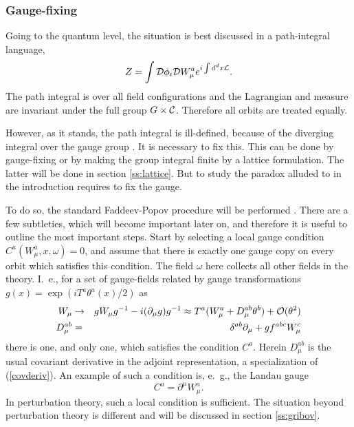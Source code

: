 \documentclass[final,twoside,12pt]{article}
\newcommand*{\La}{{\cal{L}}}
\newcommand*{\no}{\noindent}
\newcommand*{\bea}{\begin{eqnarray}}
\newcommand*{\eea}{\end{eqnarray}}
\newcommand*{\be}{\begin{equation}}
\newcommand*{\ee}{\end{equation}}
\newcommand*{\pd}{\partial}
\newcommand*{\pdm}{\pd_{\mu}}
\newcommand*{\pref}[1]{(\ref{#1})}
\newcommand*{\nn}{\nonumber}
\newcommand*{\1}{1\!\!\!\bot}
\newcommand*{\cd}{{\cal D}}
\newcommand*{\pint}{\int\cd}
\begin{document}
\subsubsection{Gauge-fixing}\label{sss:gf}

Going to the quantum level, the situation is best discussed in a path-integral language,
\be
Z=\pint\phi_i\cd W_\mu^a e^{i\int d^d x\La}\nn.
\ee
\no The path integral is over all field configurations and the Lagrangian and measure are invariant under the full group $G\times{\cal C}$. Therefore all orbits are treated equally.

However, as it stands, the path integral is ill-defined, because of the diverging integral over the gauge group \cite{Bohm:2001yx}. It is necessary to fix this. This can be done by gauge-fixing or by making the group integral finite by a lattice formulation. The latter will be done in section \ref{ss:lattice}. But to study the paradox alluded to in the introduction requires to fix the gauge.

To do so, the standard Faddeev-Popov procedure will be performed \cite{Bohm:2001yx}. There are a few subtleties, which will become important later on, and therefore it is useful to outline the most important steps. Start by selecting a local gauge condition $C^a(W_\mu^a,x,\omega)=0$, and assume that there is exactly one gauge copy on every orbit which satisfies this condition. The field $\omega$ here collects all other fields in the theory. I.\ e., for a set of gauge-fields related by gauge transformations $g(x)=\exp(i T^a\theta^a(x)/2)$ as
\bea
W_\mu&\to& gW_\mu g^{-1}-i(\pdm g) g^{-1}\approx T^a(W_\mu^a+D_\mu^{ab}\theta^b)+{\cal O}(\theta^{2})\label{gauget}\\
D_\mu^{ab}&=&\delta^{ab}\pdm+gf^{abc}W_\mu^c\nn
\eea
there is one, and only one, which satisfies the condition $C^a$. Herein $D_\mu^{ab}$ is the usual covariant derivative in the adjoint representation, a specialization of \pref{covderiv}. An example of such a condition is, e.\ g., the Landau gauge 
\be
C^a=\pd^\mu W^a_\mu\label{landaug}.
\ee
\no In perturbation theory, such a local condition is sufficient. The situation beyond perturbation theory is different and will be discussed in section \ref{ss:gribov}.
\end{document}
